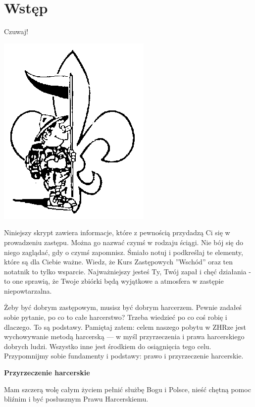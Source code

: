 \chapter{Wstęp}

Czuwaj!
\begin{floatingfigure}[l]{3cm}
  \includegraphics{grafiki/intro.png}
\end{floatingfigure}
Niniejszy skrypt zawiera informacje, które z pewnością przydadzą Ci się w prowadzeniu zastępu. Można go nazwać czymś w rodzaju ściągi. Nie bój się do niego zaglądać, gdy o czymś zapomnisz. Śmiało notuj i podkreślaj te elementy, które są dla Ciebie ważne. Wiedz, że Kurs Zastępowych ''Wschód'' oraz ten notatnik to tylko wsparcie. Najważniejszy jesteś Ty, Twój zapał i chęć działania - to one sprawią, że Twoje zbiórki będą wyjątkowe a atmosfera w zastępie niepowtarzalna. 

Żeby być dobrym zastępowym, musisz być dobrym harcerzem. Pewnie zadałeś sobie pytanie, po co to całe harcerstwo? Trzeba wiedzieć po co coś robię i dlaczego. To są podstawy. Pamiętaj zatem: celem naszego pobytu w ZHRze jest wychowywanie metodą harcerską --- w myśl przyrzeczenia i prawa harcerskiego dobrych ludzi. Wszystko inne jest  środkiem do osiągnięcia tego celu. Przypomnijmy sobie fundamenty i podstawy: prawo i przyrzeczenie harcerskie.



\textbf{Przyrzeczenie harcerskie}%

Mam szczerą wolę całym życiem pełnić służbę Bogu i Polsce, nieść chętną pomoc bliźnim i być posłusznym Prawu Harcerskiemu.



